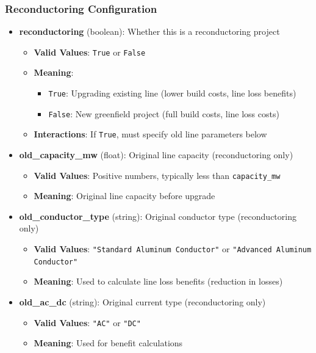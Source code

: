 \documentclass[ctcc_full_documentation.tex]{subfiles}
\begin{document}
\subsubsection{Reconductoring Configuration}

\begin{itemize}
    \item \textbf{reconductoring} (boolean): Whether this is a reconductoring project
    \begin{itemize}
        \item \textbf{Valid Values}: \texttt{True} or \texttt{False}
        \item \textbf{Meaning}: 
        \begin{itemize}
            \item \texttt{True}: Upgrading existing line (lower build costs, line loss benefits)
            \item \texttt{False}: New greenfield project (full build costs, line loss costs)
        \end{itemize}
        \item \textbf{Interactions}: If \texttt{True}, must specify old line parameters below
    \end{itemize}
    
    \item \textbf{old\_capacity\_mw} (float): Original line capacity (reconductoring only)
    \begin{itemize}
        \item \textbf{Valid Values}: Positive numbers, typically less than \texttt{capacity\_mw}
        \item \textbf{Meaning}: Original line capacity before upgrade
    \end{itemize}
    
    \item \textbf{old\_conductor\_type} (string): Original conductor type (reconductoring only)
    \begin{itemize}
        \item \textbf{Valid Values}: \texttt{"Standard Aluminum Conductor"} or \texttt{"Advanced Aluminum Conductor"}
        \item \textbf{Meaning}: Used to calculate line loss benefits (reduction in losses)
    \end{itemize}
    
    \item \textbf{old\_ac\_dc} (string): Original current type (reconductoring only)
    \begin{itemize}
        \item \textbf{Valid Values}: \texttt{"AC"} or \texttt{"DC"}
        \item \textbf{Meaning}: Used for benefit calculations
    \end{itemize}
\end{itemize}
\end{document}
